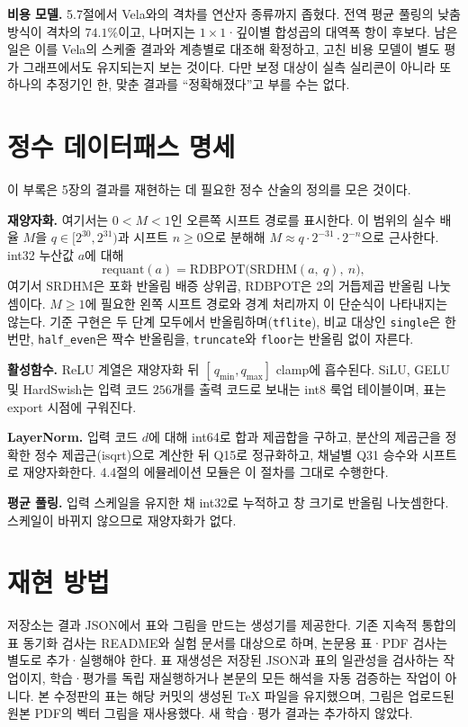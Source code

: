 \documentclass[11pt,a4paper,oneside]{report}
\begin{document}
\textbf{비용 모델.} 5.7절에서 Vela와의 격차를 연산자 종류까지 좁혔다. 전역 평균 풀링의 낮춤 방식이
격차의 $74.1\%$이고, 나머지는 $1\times1$·깊이별 합성곱의 대역폭 항이 후보다. 남은 일은 이를 Vela의 스케줄 결과와 계층별로 대조해 확정하고, 고친 비용 모델이
별도 평가 그래프에서도 유지되는지 보는 것이다. 다만 보정 대상이 실측 실리콘이 아니라 또 하나의 추정기인
한, 맞춘 결과를 ``정확해졌다''고 부를 수는 없다.

\appendix

\chapter{정수 데이터패스 명세}
\label{app:datapath}

이 부록은 5장의 결과를 재현하는 데 필요한 정수 산술의 정의를 모은 것이다.

\textbf{재양자화.} 여기서는 $0<M<1$인 오른쪽 시프트 경로를 표시한다. 이 범위의 실수 배율 $M$을 $q \in [2^{30}, 2^{31})$과 시프트 $n \geq 0$으로 분해해
$M \approx q \cdot 2^{-31} \cdot 2^{-n}$으로 근사한다. int32 누산값 $a$에 대해
\[
  \mathrm{requant}(a) = \mathrm{RDBPOT}\big(\mathrm{SRDHM}(a,\ q),\ n\big),
\]
여기서 $\mathrm{SRDHM}$은 포화 반올림 배증 상위곱, $\mathrm{RDBPOT}$은 2의 거듭제곱 반올림 나눗셈이다.
$M\geq1$에 필요한 왼쪽 시프트 경로와 경계 처리까지 이 단순식이 나타내지는 않는다.
기준 구현은 두 단계 모두에서 반올림하며(\texttt{tflite}), 비교 대상인 \texttt{single}은 한 번만,
\texttt{half\_even}은 짝수 반올림을, \texttt{truncate}와 \texttt{floor}는 반올림 없이 자른다.

\textbf{활성함수.} ReLU 계열은 재양자화 뒤 $[\,q_{\min}, q_{\max}]$ clamp에 흡수된다. SiLU, GELU 및 HardSwish는
입력 코드 $256$개를 출력 코드로 보내는 int8 룩업 테이블이며, 표는 export 시점에 구워진다.

\textbf{LayerNorm.} 입력 코드 $d$에 대해 int64로 합과 제곱합을 구하고, 분산의 제곱근을 정확한 정수
제곱근($\mathrm{isqrt}$)으로 계산한 뒤 Q15로 정규화하고, 채널별 Q31 승수와 시프트로 재양자화한다. 4.4절의
에뮬레이션 모듈은 이 절차를 그대로 수행한다.

\textbf{평균 풀링.} 입력 스케일을 유지한 채 int32로 누적하고 창 크기로 반올림 나눗셈한다. 스케일이 바뀌지
않으므로 재양자화가 없다.

\chapter{재현 방법}

저장소는 결과 JSON에서 표와 그림을 만드는 생성기를 제공한다. 기존 지속적 통합의 표 동기화 검사는
README와 실험 문서를 대상으로 하며, 논문용 표·PDF 검사는 별도로 추가·실행해야 한다.
표 재생성은 저장된 JSON과 표의 일관성을 검사하는 작업이지, 학습·평가를 독립 재실행하거나
본문의 모든 해석을 자동 검증하는 작업이 아니다. 본 수정판의 표는 해당 커밋의 생성된 TeX 파일을
유지했으며, 그림은 업로드된 원본 PDF의 벡터 그림을 재사용했다. 새 학습·평가 결과는 추가하지 않았다.
\end{document}
